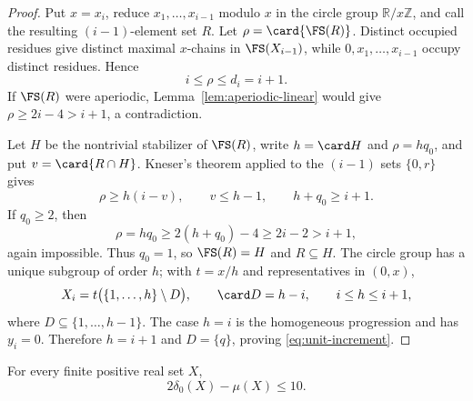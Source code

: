 \begin{proof}
Put $x=x_i$, reduce $x_1,\ldots,x_{i-1}$ modulo $x$ in the circle group
$\mathbb R/x\mathbb Z$, and call the resulting $(i-1)$-element set $R$.
Let $\rho=\card{\FS(R)}$.  Distinct occupied residues give distinct maximal
$x$-chains in $\FS(X_{i-1})$, while
$0,x_1,\ldots,x_{i-1}$ occupy distinct residues.  Hence
\[
 i\leq\rho\leq d_i=i+1.
\]
If $\FS(R)$ were aperiodic, Lemma~\ref{lem:aperiodic-linear} would give
$\rho\geq2i-4>i+1$, a contradiction.

Let $H$ be the nontrivial stabilizer of $\FS(R)$, write
$h=\card H$ and $\rho=hq_0$, and put $v=\card{R\cap H}$.  Kneser's theorem
applied to the $(i-1)$ sets $\{0,r\}$ gives
\[
 \rho\geq h(i-v),\qquad v\leq h-1,\qquad h+q_0\geq i+1.
\]
If $q_0\geq2$, then
\[
 \rho=hq_0\geq2(h+q_0)-4\geq2i-2>i+1,
\]
again impossible.  Thus $q_0=1$, so $\FS(R)=H$ and $R\subseteq H$.
The circle group has a unique subgroup of order $h$; with $t=x/h$ and
representatives in $(0,x)$,
\[
 X_i=t\bigl(\{1,\ldots,h\}\setminus D\bigr),\qquad
 \card D=h-i,\qquad i\leq h\leq i+1,
\]
where $D\subseteq\{1,\ldots,h-1\}$.  The case $h=i$ is the homogeneous
progression and has $y_i=0$.  Therefore $h=i+1$ and $D=\{q\}$, proving
\eqref{eq:unit-increment}.
\end{proof}

\begin{lemma}\label{lem:defect-excess}
For every finite positive real set $X$,
\begin{equation}
 \boxed{2\delta_0(X)-\mu(X)\leq10.}
 \label{eq:defect-excess}
\end{equation}
\end{lemma}

